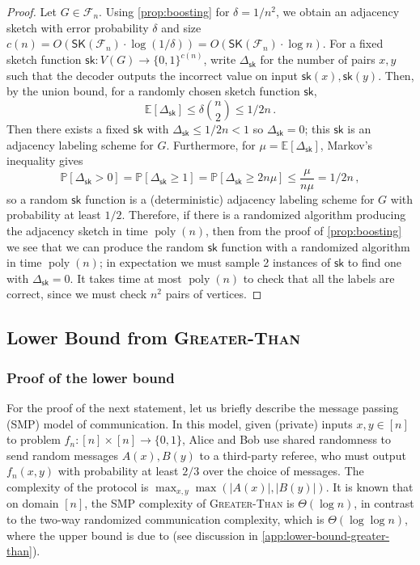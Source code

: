 \documentclass{article}
\DeclareMathOperator{\poly}{poly}
\newcommand{\Ex}[1]{\bE \left[ #1 \right]}
\renewcommand{\Pr}[1]{\bP \left[ #1 \right]} %
\newcommand{\zo}{\{0,1\}}
\newcommand{\cF}{\ensuremath{\mathcal{F}}}
\newcommand{\bE}{\ensuremath{\mathbb{E}}}
\newcommand{\bP}{\ensuremath{\mathbb{P}}}
\newcommand{\sk}{\mathsf{sk}}
\newcommand{\RL}{\mathsf{SK}}
\begin{document}
\propderandomization*
\begin{proof}
Let $G \in \cF_n$.  Using \cref{prop:boosting} for $\delta = 1/n^2$, we obtain an
adjacency sketch with error probability $\delta$ and size $c(n) = O(\RL(\cF_n) \cdot
\log(1/\delta)) = O(\RL(\cF_n) \cdot \log n)$. For a fixed sketch function $\sk : V(G) \to
\zo^{c(n)}$, write $\Delta_\sk$ for the number of pairs $x,y$ such that the decoder outputs the incorrect
value on input $\sk(x),\sk(y)$. Then, by the union bound, for a randomly chosen sketch function $\sk$,
\[
  \Ex{\Delta_\sk} \leq \delta \binom{n}{2} \leq 1/2n \,.
\]
Then there exists a fixed $\sk$ with $\Delta_\sk \leq 1/2n < 1$ so $\Delta_\sk = 0$; this $\sk$
is an adjacency labeling scheme for $G$. Furthermore, for $\mu = \Ex{\Delta_\sk}$, Markov's inequality gives
\[
  \Pr{ \Delta_\sk > 0 } = \Pr{ \Delta_\sk \geq 1 } = \Pr{ \Delta_\sk \geq 2n \mu}
  \leq \frac{\mu}{n \mu} = 1/2n \,,
\]
so a random $\sk$ function is a (deterministic) adjacency labeling scheme for $G$ with probability
at least $1/2$. Therefore, if there is a randomized algorithm producing the adjacency sketch in time
$\poly(n)$, then from the proof of \cref{prop:boosting} we see that we can produce the random $\sk$
function with a randomized algorithm in time $\poly(n)$; in expectation we  must sample 2 instances of $\sk$
to find one with $\Delta_\sk = 0$. It takes time at most $\poly(n)$ to check that all the labels are
correct, since we must check $n^2$ pairs of vertices.
\end{proof}

\subsection{Lower Bound from \textsc{Greater-Than}}
\label{section:greater-than-lb}
\subsubsection{Proof of the lower bound}

For the proof of the next statement, let us briefly describe the message passing (SMP) model of
communication.  In this model, given (private) inputs $x,y \in [n]$ to problem $f_n : [n] \times [n]
\to \zo$, Alice and Bob use shared randomness to send random messages $A(x),B(y)$ to a third-party
referee, who must output $f_n(x,y)$ with probability at least $2/3$ over the choice of messages. The
complexity of the protocol is $\max_{x,y} \max(|A(x)|, |B(y)|)$. It is known that on domain $[n]$,
the SMP complexity of \textsc{Greater-Than} is $\Theta(\log n)$, in contrast to the two-way
randomized communication complexity, which is $\Theta(\log\log n)$, where the upper bound is due to
\cite{Nis93} (see discussion in \cref{app:lower-bound-greater-than}).
\end{document}
